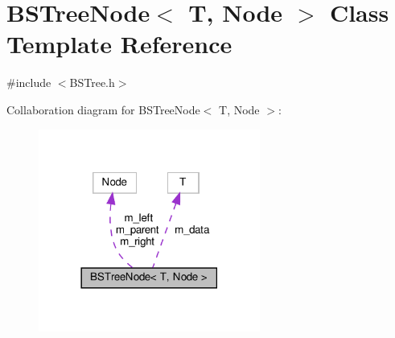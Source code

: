 \hypertarget{classBSTreeNode}{}\section{B\+S\+Tree\+Node$<$ T, Node $>$ Class Template Reference}
\label{classBSTreeNode}


{\ttfamily \#include $<$B\+S\+Tree.\+h$>$}



Collaboration diagram for B\+S\+Tree\+Node$<$ T, Node $>$\+:\nopagebreak
\begin{figure}[H]
\begin{center}
\leavevmode
\includegraphics[width=206pt]{classBSTreeNode__coll__graph}
\end{center}
\end{figure}
